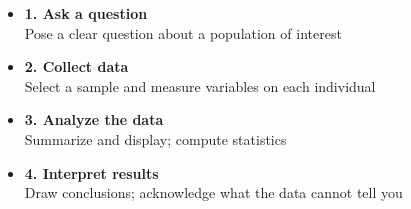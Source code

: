 \documentclass[aspectratio=169, 11pt]{beamer}
\begin{document}
{
\begin{frame}[t, plain]
  \hspace{0.55cm}%
  \begin{minipage}{0.9\textwidth}
    \vspace{1em}
    \small
    \begin{itemize}
      \setlength{\itemsep}{0.45em}\setlength{\topsep}{0em}
      \item \textbf{1.\; Ask a question}\\
        Pose a clear question about a population of interest
      \item \textbf{2.\; Collect data}\\
        Select a sample and measure variables on each individual
      \item \textbf{3.\; Analyze the data}\\
        Summarize and display; compute statistics
      \item \textbf{4.\; Interpret results}\\
        Draw conclusions; acknowledge what the data cannot tell you
    \end{itemize}
  \end{minipage}
\end{frame}
}
\end{document}
